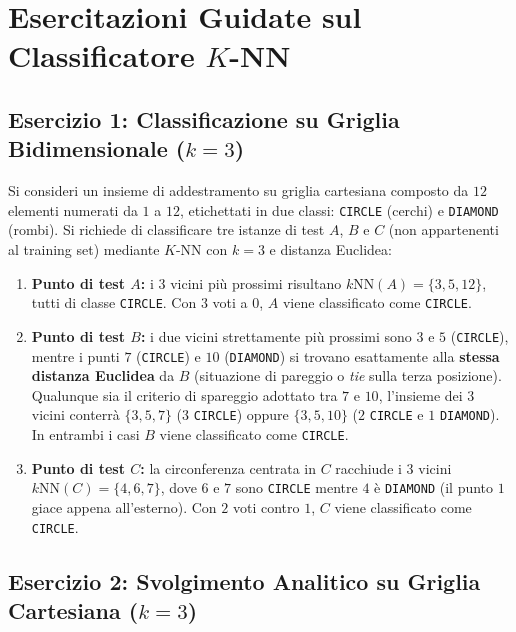 \FloatBarrier
\section{Esercitazioni Guidate sul Classificatore \texorpdfstring{$K$-NN}{K-NN}}
\label{sec:dm-knn-exercises}

\FloatBarrier
\subsection{Esercizio 1: Classificazione su Griglia Bidimensionale (\texorpdfstring{$k = 3$}{k = 3})}
\label{subsec:dm-knn-ex1}

Si consideri un insieme di addestramento su griglia cartesiana composto da $12$ elementi numerati da $1$ a $12$, etichettati in due classi: \texttt{CIRCLE} (cerchi) e \texttt{DIAMOND} (rombi). Si richiede di classificare tre istanze di test $A$, $B$ e $C$ (non appartenenti al training set) mediante $K$-NN con $k = 3$ e distanza Euclidea:
\begin{enumerate}
    \item \textbf{Punto di test $A$:} i $3$ vicini pi\`u prossimi risultano $k\text{NN}(A) = \{3, 5, 12\}$, tutti di classe \texttt{CIRCLE}. Con $3$ voti a $0$, $A$ viene classificato come \texttt{CIRCLE}.
    \item \textbf{Punto di test $B$:} i due vicini strettamente pi\`u prossimi sono $3$ e $5$ (\texttt{CIRCLE}), mentre i punti $7$ (\texttt{CIRCLE}) e $10$ (\texttt{DIAMOND}) si trovano esattamente alla \textbf{stessa distanza Euclidea} da $B$ (situazione di pareggio o \textit{tie} sulla terza posizione). Qualunque sia il criterio di spareggio adottato tra $7$ e $10$, l'insieme dei $3$ vicini conterr\`a $\{3, 5, 7\}$ ($3$ \texttt{CIRCLE}) oppure $\{3, 5, 10\}$ ($2$ \texttt{CIRCLE} e $1$ \texttt{DIAMOND}). In entrambi i casi $B$ viene classificato come \texttt{CIRCLE}.
    \item \textbf{Punto di test $C$:} la circonferenza centrata in $C$ racchiude i $3$ vicini $k\text{NN}(C) = \{4, 6, 7\}$, dove $6$ e $7$ sono \texttt{CIRCLE} mentre $4$ \`e \texttt{DIAMOND} (il punto $1$ giace appena all'esterno). Con $2$ voti contro $1$, $C$ viene classificato come \texttt{CIRCLE}.
\end{enumerate}

\FloatBarrier
\subsection{Esercizio 2: Svolgimento Analitico su Griglia Cartesiana (\texorpdfstring{$k = 3$}{k = 3})}
\label{subsec:dm-knn-ex2}

